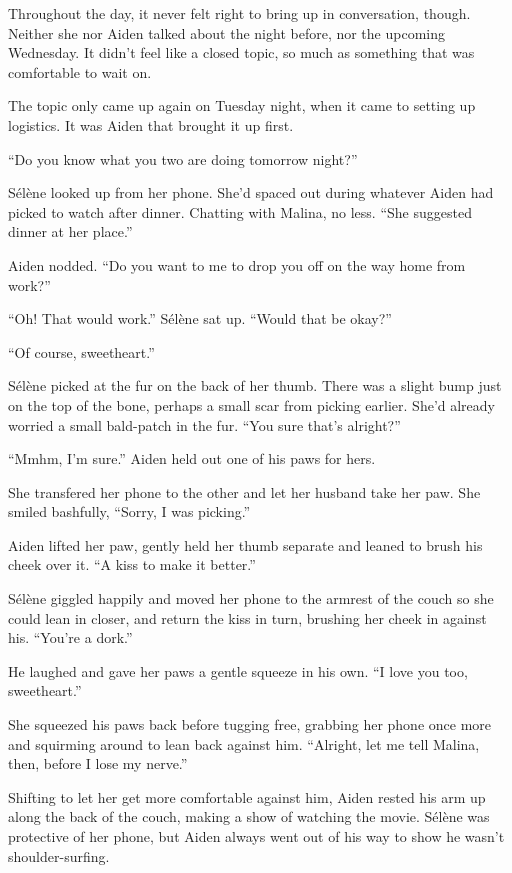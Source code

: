 Throughout the day, it never felt right to bring up in conversation, though. Neither she nor Aiden talked about the night before, nor the upcoming Wednesday. It didn't feel like a closed topic, so much as something that was comfortable to wait on.

The topic only came up again on Tuesday night, when it came to setting up logistics. It was Aiden that brought it up first.

``Do you know what you two are doing tomorrow night?''

Sélène looked up from her phone. She'd spaced out during whatever Aiden had picked to watch after dinner. Chatting with Malina, no less. ``She suggested dinner at her place.''

Aiden nodded. ``Do you want to me to drop you off on the way home from work?''

``Oh! That would work.'' Sélène sat up. ``Would that be okay?''

``Of course, sweetheart.''

Sélène picked at the fur on the back of her thumb. There was a slight bump just on the top of the bone, perhaps a small scar from picking earlier. She'd already worried a small bald-patch in the fur. ``You sure that's alright?''

``Mmhm, I'm sure.'' Aiden held out one of his paws for hers.

She transfered her phone to the other and let her husband take her paw. She smiled bashfully, ``Sorry, I was picking.''

Aiden lifted her paw, gently held her thumb separate and leaned to brush his cheek over it. ``A kiss to make it better.''

Sélène giggled happily and moved her phone to the armrest of the couch so she could lean in closer, and return the kiss in turn, brushing her cheek in against his. ``You're a dork.''

He laughed and gave her paws a gentle squeeze in his own. ``I love you too, sweetheart.''

She squeezed his paws back before tugging free, grabbing her phone once more and squirming around to lean back against him. ``Alright, let me tell Malina, then, before I lose my nerve.''

Shifting to let her get more comfortable against him, Aiden rested his arm up along the back of the couch, making a show of watching the movie. Sélène was protective of her phone, but Aiden always went out of his way to show he wasn't shoulder-surfing.

